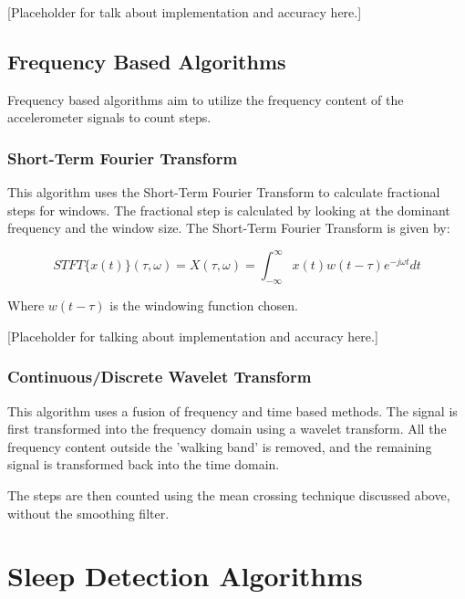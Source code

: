                     [Placeholder for talk about implementation and accuracy here.]
            \subsection{Frequency Based Algorithms}

                Frequency based algorithms aim to utilize the frequency content of the accelerometer signals to count steps.

                \subsubsection{Short-Term Fourier Transform}

                    This algorithm uses the Short-Term Fourier Transform to calculate fractional steps for windows. The fractional step is calculated by looking at the dominant frequency and the window size. The Short-Term Fourier Transform is given by:

                    \begin{equation}
                        STFT\{x(t)\}(\tau,\omega) = X(\tau,\omega) = \int_{-\infty}^{\infty}x(t)w(t-\tau)e^{-j\omega t}dt
                    \end{equation}

                    Where $w(t-\tau)$ is the windowing function chosen.

                    [Placeholder for talking about implementation and accuracy here.]

                \subsubsection{Continuous/Discrete Wavelet Transform}

                    This algorithm uses a fusion of frequency and time based methods. The signal is first transformed into the frequency domain using a wavelet transform. All the frequency content outside the 'walking band' is removed, and the remaining signal is transformed back into the time domain.

                    The steps are then counted using the mean crossing technique discussed above, without the smoothing filter.

        \section{Sleep Detection Algorithms}